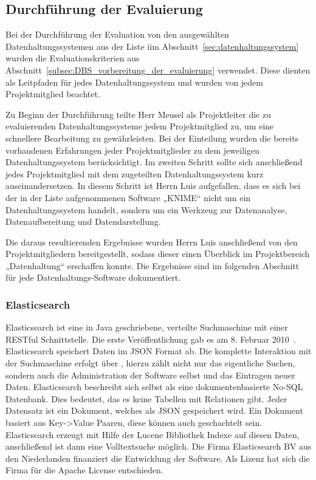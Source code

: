 {\subsection{Durchführung der Evaluierung}
\label{subsec:durchfuehrung_der_evaluierung}
Bei der Durchführung der Evaluation von den ausgewählten Datenhaltungssystemen
aus der Liste iim Abschnitt~\ref{sec:datenhaltungssystem} wurden die
Evaluationskriterien aus
Abschnitt~\ref{subsec:DBS_vorbereitung_der_evaluierung} verwendet. Diese
dienten als Leitpfaden für jedes Datenhaltungssystem und wurden von jedem
Projektmitglied beachtet.

Zu Beginn der Durchführung teilte Herr Meusel als Projektleiter die zu
evaluierenden Datenhaltungssysteme jedem Projektmitglied zu, um eine schnellere
Bearbeitung zu gewährleisten. Bei der Einteilung wurden die bereits vorhandenen
Erfahrungen jeder Projektmitglieder zu dem jeweiligen Datenhaltungssystem
berücksichtigt. Im zweiten Schritt sollte sich anschließend jedes
Projektmitglied mit dem zugeteilten Datenhaltungssystem kurz auseinandersetzen.
In diesem Schritt ist Herrn Luis aufgefallen, dass es sich bei der in der Liste
aufgenommenen Software „KNIME“ nicht um ein Datenhaltungssystem handelt,
sondern um ein Werkzeug zur Datenanalyse, Datenaufbereitung und
Datendarstellung.

Die daraus resultierenden Ergebnisse wurden Herrn Luis anschließend von den
Projektmitgliedern bereitgestellt, sodass dieser einen Überblick im
Projektbereich „Datenhaltung“ erschaffen konnte. Die Ergebnisse sind im
folgenden Abschnitt für jede Datenhaltungs\hyp{}Software dokumentiert.
\nl%

\subsubsection{Elasticsearch}
\label{subsubsec:elasticsearch}
Elasticsearch ist eine in Java geschriebene, verteilte Suchmaschine mit einer
\gls{RESTful} Schnittstelle. Die erste Veröffentlichung gab es am 8. Februar
2010~\cite{es_release}. Elasticsearch speichert Daten im \gls{JSON} Format ab.
Die komplette Interaktion mit der Suchmaschine erfolgt über
, hierzu zählt nicht nur das eigentliche Suchen, sondern
auch die Administration der Software selbst und das Eintragen neuer Daten.
Elasticsearch beschreibt sich selbst als eine dokumentenbasierte No\hyp{}SQL
Datenbank. Dies bedeutet, das es keine Tabellen mit Relationen gibt. Jeder
Datensatz ist ein Dokument, welches als \gls{JSON} gespeichert wird. Ein
Dokument basiert aus Key->Value Paaren, diese können auch geschachtelt sein.
Elasticsearch erzeugt mit Hilfe der \gls{Lucene} Bibliothek Indexe auf diesen
Daten, anschließend ist dann eine Volltextsuche möglich. Die Firma
Elasticsearch BV aus den Niederlanden finanziert die Entwicklung der Software.
Als Lizenz hat sich die Firma für die Apache License entschieden.

}
